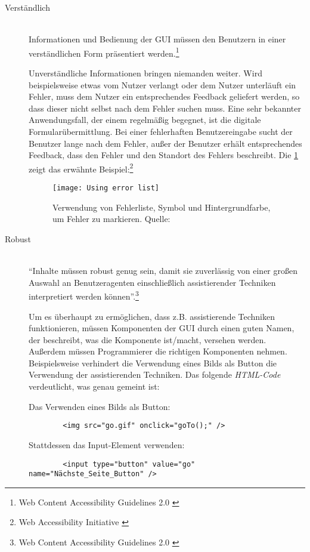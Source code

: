 \begin{description}
	\item [Verständlich]\hfill \\
	Informationen und Bedienung der \ac{GUI} müssen den Benutzern in einer verständlichen Form präsentiert 
	werden.\footnote{Web Content Accessibility Guidelines 2.0 \cite{WCAG2.0}}
	
	Unverständliche Informationen bringen niemanden weiter. Wird beispielsweise etwas vom Nutzer verlangt oder dem Nutzer unterläuft ein Fehler, muss dem Nutzer ein entsprechendes 
	Feedback geliefert werden, so dass dieser nicht selbst nach dem Fehler suchen muss. Eine sehr bekannter Anwendungsfall, der einem regelmäßig begegnet, 
	ist die digitale Formularübermittlung. Bei einer fehlerhaften Benutzereingabe sucht der Benutzer lange nach dem Fehler, außer der Benutzer erhält entsprechendes 
	Feedback, dass den Fehler und den Standort des Fehlers beschreibt. Die \cref{fig:Using error list} zeigt das erwähnte Beispiel:\footnote{Web Accessibility Initiative \cite{WAI}}
	
	\begin{figure}[H]
		\centering
		\texttt{[image: Using error list]}
		\caption[Verwendung von Fehlerliste, Symbol und Hintergrundfarbe, um Fehler zu markieren]{Verwendung von Fehlerliste, Symbol
		 und Hintergrundfarbe, um Fehler zu markieren. Quelle: \cite{WAI}}
		\label{fig:Using error list}
	\end{figure}
	
	\item [Robust]\hfill \\
	"`Inhalte müssen robust genug sein, damit sie zuverlässig von einer großen Auswahl an Benutzeragenten einschließlich assistierender Techniken 
	interpretiert werden können"'.\footnote{Web Content Accessibility Guidelines 2.0 \cite{WCAG2.0}}
	
	Um es überhaupt zu ermöglichen, dass z.B. assistierende Techniken funktionieren, müssen Komponenten der \ac{GUI} durch einen guten Namen, der beschreibt, was die Komponente
	ist/macht, versehen werden. Außerdem müssen Programmierer die richtigen Komponenten nehmen. Beispielsweise verhindert die Verwendung eines Bilds als Button die Verwendung 
	der assistierenden Techniken. Das folgende \textit{HTML-Code} verdeutlicht, was genau gemeint ist:
	
	Das Verwenden eines Bilds als Button:
	
	{\color{blue}
	\begin{verbatim}
		<img src="go.gif" onclick="goTo();" />
	\end{verbatim}}
	
	Stattdessen das Input-Element verwenden:
	
	{\color{blue}
	\begin{verbatim}
		<input type="button" value="go" name="Nächste_Seite_Button" />
	\end{verbatim}}
	
\end{description}

